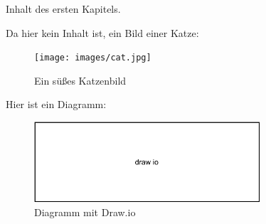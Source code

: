 \documentclass[../main.tex]{subfiles}
\begin{document}
Inhalt des ersten Kapitels.

Da hier kein Inhalt ist, ein Bild einer Katze:
\begin{figure}[H]
	\centering
	\texttt{[image: images/cat.jpg]}
	\caption{Ein süßes Katzenbild}
	\label{fig:img_cat}
\end{figure}

Hier ist ein Diagramm:

\begin{figure}[H]
	\centering
	\includegraphics[width=0.75\textwidth]{drawings/draw-io-diagram.pdf}
	\caption{Diagramm mit Draw.io}
	\label{fig:diagram}
\end{figure}
\end{document}
